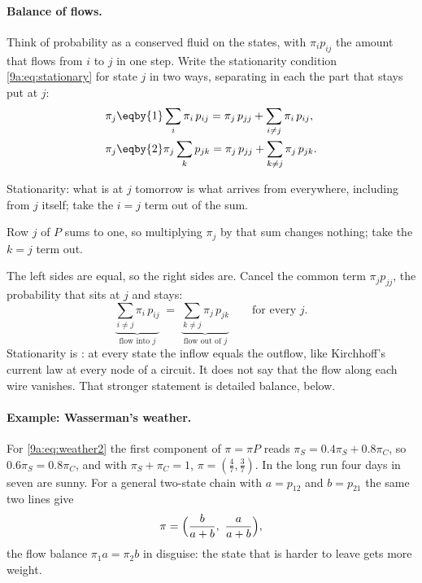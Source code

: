 \paragraph{Balance of flows.}
Think of probability as a conserved fluid on the states, with $\pi_ip_{ij}$ the amount that
flows from $i$ to $j$ in one step. Write the stationarity condition \eqref{9a:eq:stationary} for
state $j$ in two ways, separating in each the part that stays put at $j$:
\begin{align*}
  \pi_j&\eqby{1}\sum_i\pi_i\,p_{ij}=\pi_j\,p_{jj}+\sum_{i\ne j}\pi_i\,p_{ij},\\
  \pi_j&\eqby{2}\pi_j\sum_k p_{jk}=\pi_j\,p_{jj}+\sum_{k\ne j}\pi_j\,p_{jk}.
\end{align*}
\begin{explain}
  \item Stationarity: what is at $j$ tomorrow is what arrives from everywhere, including from
        $j$ itself; take the $i=j$ term out of the sum.
  \item Row $j$ of $P$ sums to one, so multiplying $\pi_j$ by that sum changes nothing; take
        the $k=j$ term out.
\end{explain}
The left sides are equal, so the right sides are. Cancel the common term $\pi_jp_{jj}$, the
probability that sits at $j$ and stays:
\begin{equation}
  \underbrace{\sum_{i\ne j}\pi_i\,p_{ij}}_{\text{flow into }j}
  \;=\;
  \underbrace{\sum_{k\ne j}\pi_j\,p_{jk}}_{\text{flow out of }j}
  \qquad\text{for every }j .
  \label{9a:eq:global-balance}
\end{equation}
Stationarity is : at every state the inflow equals the outflow, like
Kirchhoff's current law at every node of a circuit. It does not say that the flow along each
wire vanishes. That stronger statement is detailed balance, below.

\paragraph{Example: Wasserman's weather.}
For \eqref{9a:eq:weather2} the first component of $\pi=\pi P$ reads
$\pi_S=0.4\pi_S+0.8\pi_C$, so $0.6\pi_S=0.8\pi_C$, and with $\pi_S+\pi_C=1$,
$\pi=(\tfrac47,\tfrac37)$. In the long run four days in seven are sunny. For a general two-state
chain with $a=p_{12}$ and $b=p_{21}$ the same two lines give
\begin{equation}
  \pi=\Bigl(\frac{b}{a+b},\ \frac{a}{a+b}\Bigr),
  \label{9a:eq:pi-two}
\end{equation}
the flow balance $\pi_1a=\pi_2b$ in disguise: the state that is harder to leave gets more
weight.

